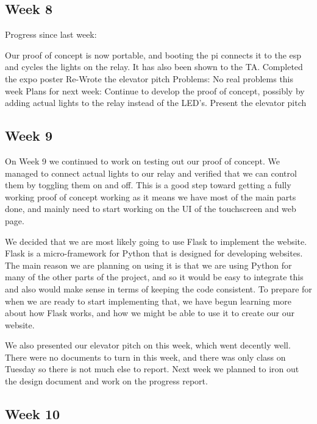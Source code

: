 \documentclass[letterpaper,10pt]{article}
\begin{document}
\subsection{Week 8}
 
Progress since last week: 
 
Our proof of concept is now portable, and booting the pi connects it to the esp and cycles the lights on the relay. It has also been shown to the TA. 
Completed the expo poster 
Re-Wrote the elevator pitch 
Problems: 
No real problems this week 
Plans for next week: 
Continue to develop the proof of concept, possibly by adding actual lights to the relay instead of the LED's. 
Present the elevator pitch 

\subsection{Week 9}
 
On Week 9 we continued to work on testing out our proof of concept. We managed
to connect actual lights to our relay and verified that we can control them by
toggling them on and off. This is a good step toward getting a fully working
proof of concept working as it means we have most of the main parts done, and
mainly need to start working on the UI of the touchscreen and web page.

We decided that we are most likely going to use Flask to implement the website.
Flask is a micro-framework for Python that is designed for developing websites.
The main reason we are planning on using it is that we are using Python for
many of the other parts of the project, and so it would be easy to integrate
this and also would make sense in terms of keeping the code consistent. To
prepare for when we are ready to start implementing that, we have begun
learning more about how Flask works, and how we might be able to use it to
create our our website.

We also presented our elevator pitch on this week, which went decently well.
There were no documents to turn in this week, and there was only class on
Tuesday so there is not much else to report. Next week we planned to iron out
the design document and work on the progress report. 

\subsection{Week 10}
\end{document}
